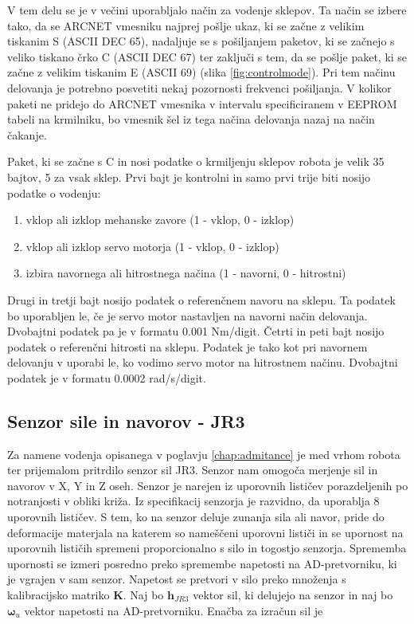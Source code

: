 \documentclass[a4paper]{article}
\begin{document}
V tem delu se je v večini uporabljalo način za vodenje sklepov. Ta način se izbere tako, da se ARCNET vmesniku najprej pošlje ukaz, ki se začne z velikim tiskanim S (ASCII DEC 65), nadaljuje se s pošiljanjem paketov, ki se začnejo s veliko tiskano črko C (ASCII DEC 67) ter zaključi s tem, da se pošlje paket, ki se začne z velikim tiskanim E (ASCII 69) (slika \ref{fig:controlmode}). Pri tem načinu delovanja je potrebno posvetiti nekaj pozornosti frekvenci pošiljanja. V kolikor paketi ne pridejo do ARCNET vmesnika v intervalu specificiranem v EEPROM tabeli na krmilniku, bo vmesnik šel iz tega načina delovanja nazaj na način čakanje.

Paket, ki se začne s C in nosi podatke o krmiljenju sklepov robota je velik 35 bajtov, 5 za vsak sklep. Prvi bajt je kontrolni in samo prvi trije  biti nosijo podatke o vodenju:

\begin{enumerate}
	\item vklop ali izklop mehanske zavore (1 - vklop, 0 - izklop)
	\item vklop ali izklop servo motorja (1 - vklop, 0 - izklop)
	\item izbira navornega ali hitrostnega načina (1 - navorni, 0 - hitrostni)
\end{enumerate}
Drugi in tretji bajt nosijo podatek o referenčnem navoru na sklepu. Ta podatek bo uporabljen le, če je servo motor nastavljen na navorni način delovanja. Dvobajtni podatek pa je v formatu 0.001 Nm/digit.
Četrti in peti bajt nosijo podatek o referenčni hitrosti na sklepu. Podatek je tako kot pri navornem delovanju v uporabi le, ko vodimo servo motor na hitrostnem načinu. Dvobajtni podatek je v formatu 0.0002 rad/s/digit.

\subsection{Senzor sile in navorov - JR3}

Za namene vodenja opisanega v poglavju \ref{chap:admitance} je med vrhom robota ter prijemalom pritrdilo senzor sil JR3. Senzor nam omogoča merjenje sil in navorov v X, Y in Z oseh. Senzor je narejen iz uporovnih lističev porazdeljenih po notranjosti v obliki križa. Iz specifikacij senzorja \cite{jr3_doc_ext} je razvidno, da uporablja 8 uporovnih lističev. S tem, ko na senzor deluje zunanja sila ali navor, pride do deformacije materjala na katerem so nameščeni uporovni lističi in se upornost na uporovnih lističih spremeni proporcionalno s silo in togostjo senzorja. Sprememba upornosti se izmeri posredno preko spremembe napetosti na AD-pretvorniku, ki je vgrajen v sam senzor. Napetost se pretvori v silo preko množenja s kalibracijsko matriko \textbf{K}. Naj bo $\textbf{h}_{JR3}$ vektor sil, ki delujejo na senzor in naj bo $\mathbf{\omega}_u$ vektor napetosti na AD-pretvorniku. Enačba za izračun sil je
\end{document}
